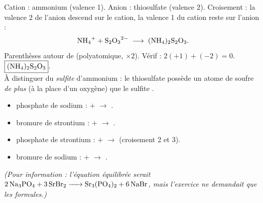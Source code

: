 \documentclass[11pt,a4paper]{article}
\begin{document}
\begin{corrige}
Cation : ammonium  (valence 1). Anion : thiosulfate  (valence 2).
Croisement : la valence 2 de l'anion descend sur le cation, la valence 1 du cation reste sur l'anion :
\[ \ce{NH4+} + \ce{S2O3^2-} \;\longrightarrow\; \ce{(NH4)2S2O3}. \]
Parenthèses autour de  (polyatomique, $\times 2$). Vérif : $2(+1)+(-2)=0$. \checkmark \quad
$\boxed{\ce{(NH4)2S2O3}}$. \\
À distinguer du \emph{sulfite} d'ammonium  : le thiosulfate  possède un atome de
soufre \emph{de plus} (à la place d'un oxygène) que le sulfite .
\end{corrige}

\begin{corrige}
\begin{itemize}[leftmargin=1.5em,topsep=1pt,itemsep=1pt]
  \item phosphate de sodium : $+$ $\to$ .
  \item bromure de strontium : $+$ $\to$ .
  \item phosphate de strontium : $+$ $\to$  (croisement 2 et 3).
  \item bromure de sodium : $+$ $\to$ .
\end{itemize}
\emph{(Pour information : l'équation équilibrée serait $\ce{2 Na3PO4 + 3 SrBr2 -> Sr3(PO4)2 + 6 NaBr}$,
mais l'exercice ne demandait que les formules.)}
\end{corrige}
\end{document}

